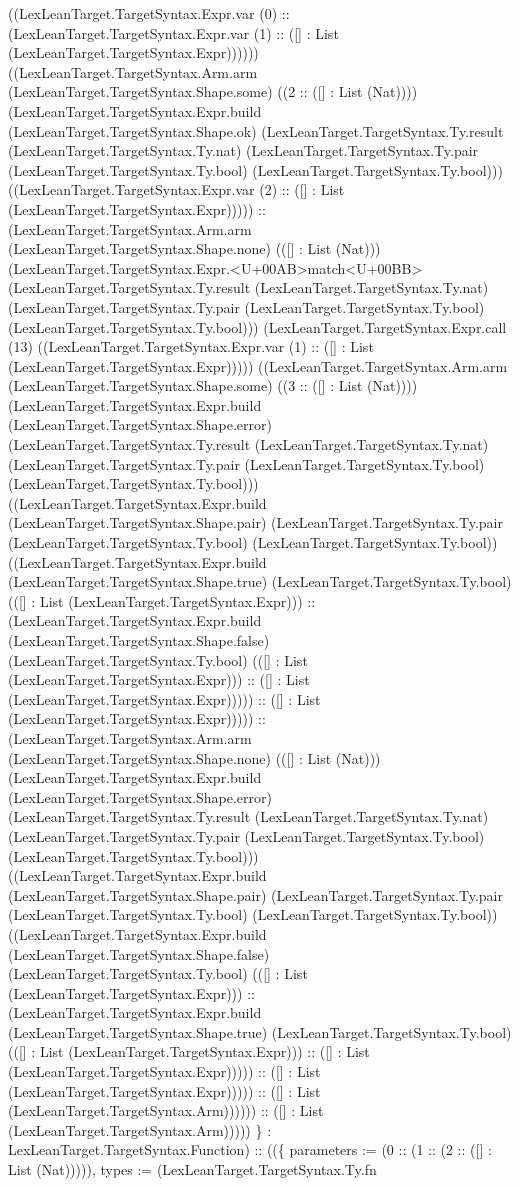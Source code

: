 \documentclass[11pt]{article}
\begin{document}
((LexLeanTarget.TargetSyntax.Expr.var (0) :: (LexLeanTarget.TargetSyntax.Expr.var (1) :: ([] : List (LexLeanTarget.TargetSyntax.Expr)))))) ((LexLeanTarget.TargetSyntax.Arm.arm (LexLeanTarget.TargetSyntax.Shape.some) ((2 :: ([] : List (Nat)))) (LexLeanTarget.TargetSyntax.Expr.build (LexLeanTarget.TargetSyntax.Shape.ok) (LexLeanTarget.TargetSyntax.Ty.result (LexLeanTarget.TargetSyntax.Ty.nat) (LexLeanTarget.TargetSyntax.Ty.pair (LexLeanTarget.TargetSyntax.Ty.bool) (LexLeanTarget.TargetSyntax.Ty.bool))) ((LexLeanTarget.TargetSyntax.Expr.var (2) :: ([] : List (LexLeanTarget.TargetSyntax.Expr))))) :: (LexLeanTarget.TargetSyntax.Arm.arm (LexLeanTarget.TargetSyntax.Shape.none) (([] : List (Nat))) (LexLeanTarget.TargetSyntax.Expr.<U+00AB>match<U+00BB> (LexLeanTarget.TargetSyntax.Ty.result (LexLeanTarget.TargetSyntax.Ty.nat) (LexLeanTarget.TargetSyntax.Ty.pair (LexLeanTarget.TargetSyntax.Ty.bool) (LexLeanTarget.TargetSyntax.Ty.bool))) (LexLeanTarget.TargetSyntax.Expr.call (13) ((LexLeanTarget.TargetSyntax.Expr.var (1) :: ([] : List (LexLeanTarget.TargetSyntax.Expr))))) ((LexLeanTarget.TargetSyntax.Arm.arm (LexLeanTarget.TargetSyntax.Shape.some) ((3 :: ([] : List (Nat)))) (LexLeanTarget.TargetSyntax.Expr.build (LexLeanTarget.TargetSyntax.Shape.error) (LexLeanTarget.TargetSyntax.Ty.result (LexLeanTarget.TargetSyntax.Ty.nat) (LexLeanTarget.TargetSyntax.Ty.pair (LexLeanTarget.TargetSyntax.Ty.bool) (LexLeanTarget.TargetSyntax.Ty.bool))) ((LexLeanTarget.TargetSyntax.Expr.build (LexLeanTarget.TargetSyntax.Shape.pair) (LexLeanTarget.TargetSyntax.Ty.pair (LexLeanTarget.TargetSyntax.Ty.bool) (LexLeanTarget.TargetSyntax.Ty.bool)) ((LexLeanTarget.TargetSyntax.Expr.build (LexLeanTarget.TargetSyntax.Shape.true) (LexLeanTarget.TargetSyntax.Ty.bool) (([] : List (LexLeanTarget.TargetSyntax.Expr))) :: (LexLeanTarget.TargetSyntax.Expr.build (LexLeanTarget.TargetSyntax.Shape.false) (LexLeanTarget.TargetSyntax.Ty.bool) (([] : List (LexLeanTarget.TargetSyntax.Expr))) :: ([] : List (LexLeanTarget.TargetSyntax.Expr))))) :: ([] : List (LexLeanTarget.TargetSyntax.Expr))))) :: (LexLeanTarget.TargetSyntax.Arm.arm (LexLeanTarget.TargetSyntax.Shape.none) (([] : List (Nat))) (LexLeanTarget.TargetSyntax.Expr.build (LexLeanTarget.TargetSyntax.Shape.error) (LexLeanTarget.TargetSyntax.Ty.result (LexLeanTarget.TargetSyntax.Ty.nat) (LexLeanTarget.TargetSyntax.Ty.pair (LexLeanTarget.TargetSyntax.Ty.bool) (LexLeanTarget.TargetSyntax.Ty.bool))) ((LexLeanTarget.TargetSyntax.Expr.build (LexLeanTarget.TargetSyntax.Shape.pair) (LexLeanTarget.TargetSyntax.Ty.pair (LexLeanTarget.TargetSyntax.Ty.bool) (LexLeanTarget.TargetSyntax.Ty.bool)) ((LexLeanTarget.TargetSyntax.Expr.build (LexLeanTarget.TargetSyntax.Shape.false) (LexLeanTarget.TargetSyntax.Ty.bool) (([] : List (LexLeanTarget.TargetSyntax.Expr))) :: (LexLeanTarget.TargetSyntax.Expr.build (LexLeanTarget.TargetSyntax.Shape.true) (LexLeanTarget.TargetSyntax.Ty.bool) (([] : List (LexLeanTarget.TargetSyntax.Expr))) :: ([] : List (LexLeanTarget.TargetSyntax.Expr))))) :: ([] : List (LexLeanTarget.TargetSyntax.Expr))))) :: ([] : List (LexLeanTarget.TargetSyntax.Arm)))))) :: ([] : List (LexLeanTarget.TargetSyntax.Arm))))) \} : LexLeanTarget.TargetSyntax.Function) :: ((\{ parameters := (0 :: (1 :: (2 :: ([] : List (Nat))))), types := (LexLeanTarget.TargetSyntax.Ty.fn 
\end{document}
